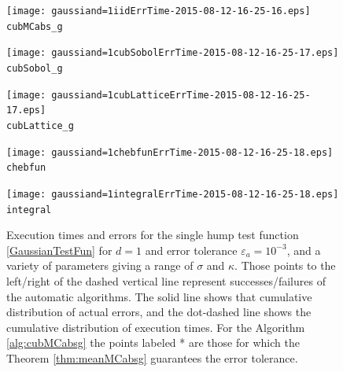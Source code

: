 \documentclass{iitthesis}
\begin{document}
\begin{figure}
\centering
\begin{minipage}{9cm} \centering \texttt{[image: gaussiand=1iidErrTime-2015-08-12-16-25-16.eps]} \\ {\tt cubMCabs\_g}  \end{minipage}
\begin{minipage}{7cm} \centering \texttt{[image: gaussiand=1cubSobolErrTime-2015-08-12-16-25-17.eps]} \\  {\tt cubSobol\_g}\end{minipage}
\begin{minipage}{7cm} \centering \texttt{[image: gaussiand=1cubLatticeErrTime-2015-08-12-16-25-17.eps]} \\ {\tt cubLattice\_g} \end{minipage}
\begin{minipage}{7cm} \centering \texttt{[image: gaussiand=1chebfunErrTime-2015-08-12-16-25-18.eps]} \\ {\tt chebfun} \end{minipage}
\begin{minipage}{7cm} \centering \texttt{[image: gaussiand=1integralErrTime-2015-08-12-16-25-18.eps]} \\ {\tt integral} \end{minipage}
\caption{Execution times and errors for the single hump test function \eqref{GaussianTestFun} for $d=1$ and error tolerance $\varepsilon_a=10^{-3}$, and a variety of parameters giving a range of $\sigma$ and $\kappa$. Those points to the left/right of the dashed vertical line represent successes/failures of the automatic algorithms.  The solid line shows that cumulative distribution of actual errors, and the dot-dashed line shows the cumulative distribution of execution times.  For the Algorithm \ref{alg:cubMCabsg} the points labeled * are those for which the Theorem \ref{thm:meanMCabsg} guarantees the error tolerance.\label{fig:GaussianTestFun} }
\end{figure}
\end{document}
